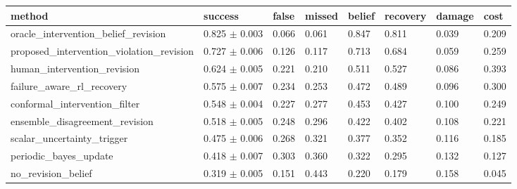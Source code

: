 \begin{tabular}{llllllll}
\toprule
method & success & false & missed & belief & recovery & damage & cost \\
\midrule
oracle\_intervention\_belief\_revision & 0.825 $\pm$ 0.003 & 0.066 & 0.061 & 0.847 & 0.811 & 0.039 & 0.209 \\
proposed\_intervention\_violation\_revision & 0.727 $\pm$ 0.006 & 0.126 & 0.117 & 0.713 & 0.684 & 0.059 & 0.259 \\
human\_intervention\_revision & 0.624 $\pm$ 0.005 & 0.221 & 0.210 & 0.511 & 0.527 & 0.086 & 0.393 \\
failure\_aware\_rl\_recovery & 0.575 $\pm$ 0.007 & 0.234 & 0.253 & 0.472 & 0.489 & 0.096 & 0.300 \\
conformal\_intervention\_filter & 0.548 $\pm$ 0.004 & 0.227 & 0.277 & 0.453 & 0.427 & 0.100 & 0.249 \\
ensemble\_disagreement\_revision & 0.518 $\pm$ 0.005 & 0.248 & 0.296 & 0.422 & 0.402 & 0.108 & 0.221 \\
scalar\_uncertainty\_trigger & 0.475 $\pm$ 0.006 & 0.268 & 0.321 & 0.377 & 0.352 & 0.116 & 0.185 \\
periodic\_bayes\_update & 0.418 $\pm$ 0.007 & 0.303 & 0.360 & 0.322 & 0.295 & 0.132 & 0.127 \\
no\_revision\_belief & 0.319 $\pm$ 0.005 & 0.151 & 0.443 & 0.220 & 0.179 & 0.158 & 0.045 \\
\bottomrule
\end{tabular}

